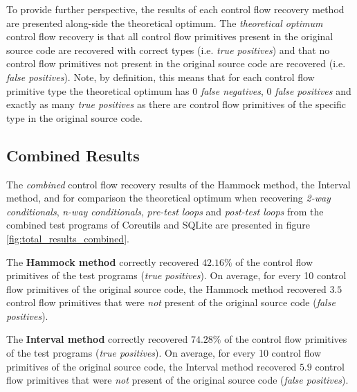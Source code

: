To provide further perspective, the results of each control flow recovery method are presented along-side the theoretical optimum. The \textit{theoretical optimum} control flow recovery is that all control flow primitives present in the original source code are recovered with correct types (i.e. \textit{true positives}) and that no control flow primitives not present in the original source code are recovered (i.e. \textit{false positives}). Note, by definition, this means that for each control flow primitive type the theoretical optimum has 0 \textit{false negatives}, 0 \textit{false positives} and exactly as many \textit{true positives} as there are control flow primitives of the specific type in the original source code.


\clearpage

\subsection{Combined Results}
\label{sec:combined_results}

The \textit{combined} control flow recovery results of the Hammock method, the Interval method, and for comparison the theoretical optimum when recovering \textit{2-way conditionals}, \textit{n-way conditionals}, \textit{pre-test loops} and \textit{post-test loops} from the combined test programs of Coreutils and SQLite are presented in figure \ref{fig:total_results_combined}.

The \textbf{Hammock method} correctly recovered $42.16\%$ of the control flow primitives of the test programs (\textit{true positives}). On average, for every 10 control flow primitives of the original source code, the Hammock method recovered $3.5$ control flow primitives that were \textit{not} present of the original source code (\textit{false positives}).

The \textbf{Interval method} correctly recovered $74.28\%$ of the control flow primitives of the test programs (\textit{true positives}). On average, for every 10 control flow primitives of the original source code, the Interval method recovered $5.9$ control flow primitives that were \textit{not} present of the original source code (\textit{false positives}).

